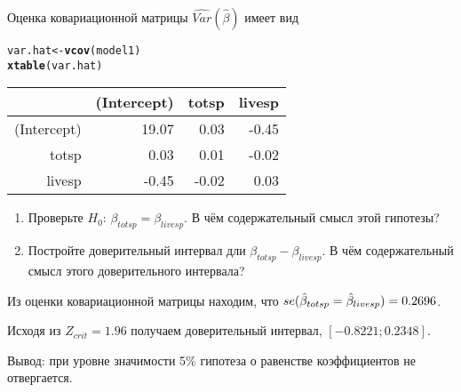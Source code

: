 \documentclass[pdftex,11pt,openany]{book}\usepackage[]{graphicx}\usepackage[]{color}
\makeatletter
\newcommand{\hlstd}[1]{\textcolor[rgb]{0.345,0.345,0.345}{#1}}%
\newcommand{\hlkwb}[1]{\textcolor[rgb]{0.69,0.353,0.396}{#1}}%
\newcommand{\hlkwd}[1]{\textcolor[rgb]{0.737,0.353,0.396}{\textbf{#1}}}%
\newenvironment{kframe}{%
 \def\at@end@of@kframe{}%
 \ifinner\ifhmode%
  \def\at@end@of@kframe{\end{minipage}}%
  \begin{minipage}{\columnwidth}%
 \fi\fi%
 \def\FrameCommand##1{\hskip\@totalleftmargin \hskip-\fboxsep
 \colorbox{shadecolor}{##1}\hskip-\fboxsep
     \hskip-\linewidth \hskip-\@totalleftmargin \hskip\columnwidth}%
 \MakeFramed {\advance\hsize-\width
   \@totalleftmargin\z@ \linewidth\hsize
   \@setminipage}}%
 {\par\unskip\endMakeFramed%
 \at@end@of@kframe}
\makeatother
\begin{document}
\begin{problem}
Оценка ковариационной матрицы $\widehat{Var}(\hat{\beta})$ имеет вид
\begin{kframe}
\begin{alltt}
\hlstd{var.hat} \hlkwb{<-} \hlkwd{vcov}\hlstd{(model1)}
\hlkwd{xtable}\hlstd{(var.hat)}
\end{alltt}
\end{kframe}%
\begin{table}[ht]
\centering
\begin{tabular}{rrrr}
  \hline
 & (Intercept) & totsp & livesp \\ 
  \hline
(Intercept) & 19.07 & 0.03 & -0.45 \\ 
  totsp & 0.03 & 0.01 & -0.02 \\ 
  livesp & -0.45 & -0.02 & 0.03 \\ 
   \hline
\end{tabular}
\end{table}


\begin{enumerate}
\item Проверьте $H_0$: $\beta_{totsp}=\beta_{livesp}$. В чём содержательный смысл этой гипотезы?
\item Постройте доверительный интервал дли $\beta_{totsp}-\beta_{livesp}$. В чём содержательный смысл этого доверительного интервала?
\end{enumerate}
\end{problem}


\begin{solution}



Из оценки ковариационной матрицы находим, что $se(\hat{\beta}_{totsp}=\hat{\beta}_{livesp})=0.2696$.

Исходя из $Z_{crit}=1.96$ получаем доверительный интервал, $[\ensuremath{-0.8221};0.2348]$.

Вывод: при уровне значимости 5\% гипотеза о равенстве коэффициентов не отвергается.
\end{solution}
\end{document}
